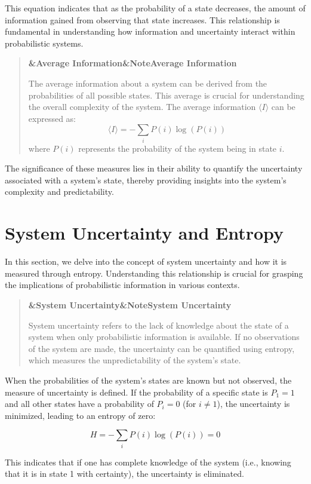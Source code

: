 \documentclass[a4paper]{article}
\newcommand{\boxheading}[1]{%
  \par\smallskip
  \noindent\textbf{\ifx&#1&Note\else#1\fi}\par
  \smallskip
}
\newenvironment{defbox}[1][]{%
  \begin{quote}\color{green!40!black}\boxheading{#1}\normalcolor
}{\end{quote}}
\newenvironment{rembox}[1][]{%
  \begin{quote}\color{black!70}\boxheading{#1}\normalcolor
}{\end{quote}}
\begin{document}
This equation indicates that as the probability of a state decreases, the amount of information gained from observing that state increases. This relationship is fundamental in understanding how information and uncertainty interact within probabilistic systems.

\begin{rembox}[Average Information]
The average information about a system can be derived from the probabilities of all possible states. This average is crucial for understanding the overall complexity of the system. The average information \( \langle I \rangle \) can be expressed as:
\[
\langle I \rangle = -\sum_{i} P(i) \log(P(i))
\]
where \( P(i) \) represents the probability of the system being in state \( i \).
\end{rembox}

The significance of these measures lies in their ability to quantify the uncertainty associated with a system's state, thereby providing insights into the system's complexity and predictability.

\section{System Uncertainty and Entropy}
In this section, we delve into the concept of system uncertainty and how it is measured through entropy. Understanding this relationship is crucial for grasping the implications of probabilistic information in various contexts.

\begin{defbox}[System Uncertainty]
System uncertainty refers to the lack of knowledge about the state of a system when only probabilistic information is available. If no observations of the system are made, the uncertainty can be quantified using entropy, which measures the unpredictability of the system's state.
\end{defbox}

When the probabilities of the system's states are known but not observed, the measure of uncertainty is defined. If the probability of a specific state is \( P_1 = 1 \) and all other states have a probability of \( P_i = 0 \) (for \( i \neq 1 \)), the uncertainty is minimized, leading to an entropy of zero:

\begin{equation}
H = -\sum_{i} P(i) \log(P(i)) = 0
\end{equation}

This indicates that if one has complete knowledge of the system (i.e., knowing that it is in state 1 with certainty), the uncertainty is eliminated.
\end{document}
